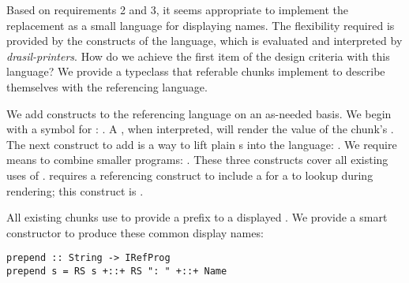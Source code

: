 Based on requirements 2 and 3, it seems appropriate to implement the replacement as a small language for displaying names. The flexibility required is provided by the constructs of the language, which is evaluated and interpreted by \textit{drasil-printers}. How do we achieve the first item of the design criteria with this language? We provide a typeclass that referable chunks implement to describe themselves with the referencing language.

We add constructs to the referencing language on an as-needed basis. We begin with a symbol for : . A , when interpreted, will render the value of the chunk's . The next construct to add is a way to lift plain s into the language: . We require means to combine smaller programs: . These three constructs cover all existing uses of .  requires a referencing construct to include a  for a  to lookup during rendering; this construct is . 

%

All existing chunks use  to provide a prefix to a displayed . We provide a smart constructor to produce these common display names:

\begin{tcolorbox}
\begin{verbatim}
prepend :: String -> IRefProg
prepend s = RS s +::+ RS ": " +::+ Name
\end{verbatim}
\end{tcolorbox}



